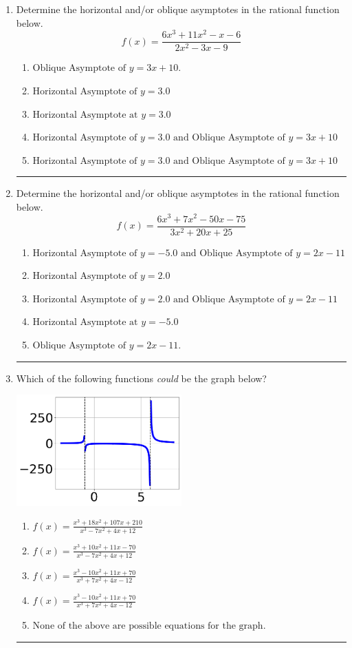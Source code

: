 \documentclass[14pt]{extbook}
\newcommand{\litem}[1]{\item#1\hspace*{-1cm}\rule{\textwidth}{0.4pt}}
\begin{document}
\begin{enumerate}
\litem{
Determine the horizontal and/or oblique asymptotes in the rational function below.\[ f(x) = \frac{6x^{3} +11 x^{2} -x -6}{2x^{2} -3 x -9} \]\begin{enumerate}[label=\Alph*.]
\item \( \text{Oblique Asymptote of } y = 3x + 10. \)
\item \( \text{Horizontal Asymptote of } y = 3.0  \)
\item \( \text{Horizontal Asymptote at } y = 3.0 \)
\item \( \text{Horizontal Asymptote of } y = 3.0 \text{ and Oblique Asymptote of } y = 3x + 10 \)
\item \( \text{Horizontal Asymptote of } y = 3.0 \text{ and Oblique Asymptote of } y = 3x + 10 \)

\end{enumerate} }
\litem{
Determine the horizontal and/or oblique asymptotes in the rational function below.\[ f(x) = \frac{6x^{3} +7 x^{2} -50 x -75}{3x^{2} +20 x + 25} \]\begin{enumerate}[label=\Alph*.]
\item \( \text{Horizontal Asymptote of } y = -5.0 \text{ and Oblique Asymptote of } y = 2x -11 \)
\item \( \text{Horizontal Asymptote of } y = 2.0  \)
\item \( \text{Horizontal Asymptote of } y = 2.0 \text{ and Oblique Asymptote of } y = 2x -11 \)
\item \( \text{Horizontal Asymptote at } y = -5.0 \)
\item \( \text{Oblique Asymptote of } y = 2x -11. \)

\end{enumerate} }
\litem{
Which of the following functions \textit{could} be the graph below?
\begin{center}
    \includegraphics[width=0.5\textwidth]{../Figures/identifyGraphOfRationalFunctionC.png}
\end{center}
\begin{enumerate}[label=\Alph*.]
\item \( f(x)=\frac{x^{3} +18 x^{2} +107 x + 210}{x^{3} -7 x^{2} +4 x + 12} \)
\item \( f(x)=\frac{x^{3} +10 x^{2} +11 x -70}{x^{3} -7 x^{2} +4 x + 12} \)
\item \( f(x)=\frac{x^{3} -10 x^{2} +11 x + 70}{x^{3} +7 x^{2} +4 x -12} \)
\item \( f(x)=\frac{x^{3} -10 x^{2} +11 x + 70}{x^{3} +7 x^{2} +4 x -12} \)
\item \( \text{None of the above are possible equations for the graph.} \)


\end{enumerate}}
\end{enumerate}
\end{document}
